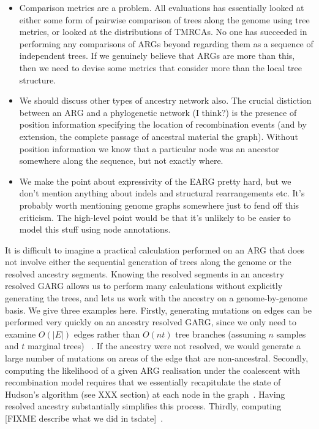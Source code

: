 \documentclass{article}
\begin{document}
\begin{itemize}
\item Comparison metrics are a problem. All evaluations has essentially
looked at either some form of pairwise comparison of trees along the genome
using tree metrics, or looked at the distributions of TMRCAs. No
one has succeeded in performing any comparisons of ARGs beyond
regarding them as a sequence of independent trees. If we genuinely believe
that ARGs are more than this, then we need to devise some metrics that
consider more than the local tree structure.

\item We should discuss other types of ancestry network also.
The crucial distiction between an ARG and a phylogenetic network (I think?) is
the presence of position information specifying the location of
recombination events (and by extension, the complete passage
of ancestral material the graph). Without position information
we know that a particular node was an ancestor somewhere along the
sequence, but not exactly where.

\item We make the point about expressivity of the EARG pretty
hard, but we don't mention anything about indels and structural
rearrangements etc. It's probably worth mentioning genome graphs
somewhere just to fend off this criticism. The high-level point
would be that it's unlikely to be easier to model this stuff
using node annotations.

\end{itemize}

It is difficult to imagine a practical calculation performed on an
ARG that does not involve either the sequential generation of trees
along the genome or the resolved ancestry segments.
Knowing the resolved segments in an ancestry resolved GARG allows
us to perform many calculations without explicitly generating
the trees, and lets us work with the ancestry on a genome-by-genome
basis. We give three examples here. Firstly, generating mutations
on edges can be performed very quickly on an ancestry resolved
GARG, since we only need to examine $O(|E|)$ edges rather than
$O(nt)$ tree branches (assuming $n$ samples and $t$ marginal trees)
~\citep{baumdicker2021efficient}. If the ancestry were not resolved,
we would generate a large number of mutations on areas of the edge that
are non-ancestral. Secondly, computing the likelihood of a given
ARG realisation under the coalescent with recombination model
requires that we essentially recapitulate the state of Hudson's
algorithm (see XXX section) at each node in
the graph~\citep{baumdicker2021efficient}. Having resolved ancestry
substantially simplifies this process. Thirdly, computing
[FIXME describe what we did in tsdate]~\citep{wohns2021unified}.
\end{document}
